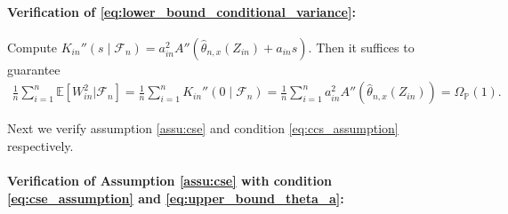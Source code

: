 \documentclass[12pt]{article}
\theoremstyle{definition}
\def\P{\mathbb{P}}
\def\P{\mathbb{P}}
\newcommand{\E}{\mathbb E}								%
\renewcommand{\P}{\mathbb{P}}							%
\newcommand{\srz}{Z}									%
\begin{document}
\paragraph{\textbf{Verification of \eqref{eq:lower_bound_conditional_variance}}:}
Compute $K_{in}''(s\mid \mathcal{F}_n)= a_{in}^2A''(\widehat \theta_{n,x}(\srz_{in})+a_{in}s)$. Then it suffices to guarantee 
\begin{align*}
  \frac{1}{n}\sum_{i=1}^n \E[W_{in}^2|\mathcal{F}_n]=\frac{1}{n}\sum_{i=1}^n K_{in}''(0\mid \mathcal{F}_n)=\frac{1}{n}\sum_{i=1}^n a_{in}^2A''(\widehat \theta_{n,x}(\srz_{in}))=\Omega_\P(1).
\end{align*}

\noindent Next we verify assumption \ref{assu:cse} and condition \eqref{eq:ccs_assumption} respectively.

\paragraph{Verification of Assumption \ref{assu:cse} with condition \eqref{eq:cse_assumption} and \eqref{eq:upper_bound_theta_a}:} 
\end{document}
